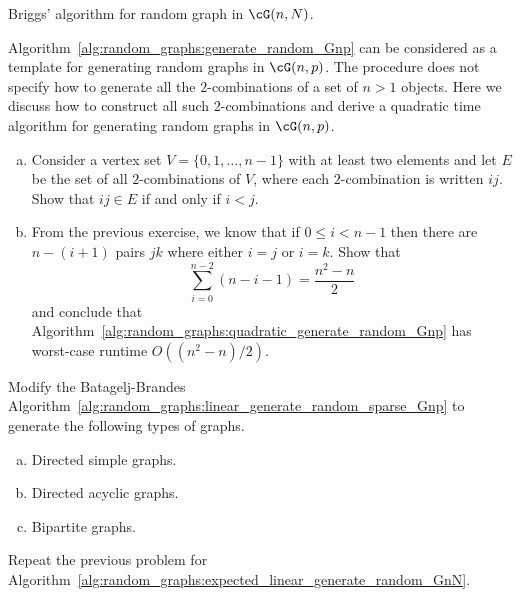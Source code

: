 \begin{problem}
\begin{algorithm}[!htbp]

\caption{Briggs' algorithm for random graph in $\cG(n,N)$.}
\label{alg:random_graphs:Briggs_random_GnN}
\end{algorithm}

\item\label{prob:random_graphs:quadratic_generate_random_Gnp}
  Algorithm~\ref{alg:random_graphs:generate_random_Gnp} can be
  considered as a template for generating random graphs in
  $\cG(n,p)$. The procedure does not specify how to generate all the
  $2$-combinations of a set of $n > 1$ objects. Here we discuss how to
  construct all such $2$-combinations and derive a quadratic time
  algorithm for generating random graphs in $\cG(n,p)$.
  \begin{enumerate}[(a)]
  \item Consider a vertex set $V = \{0, 1, \dots, n - 1\}$ with at
    least two elements and let $E$ be the set of all $2$-combinations
    of $V$, where each $2$-combination is written $ij$. Show that
    $ij \in E$ if and only if $i < j$.

  \item From the previous exercise, we know that if $0 \leq i < n - 1$
    then there are $n - (i + 1)$ pairs $jk$ where either $i = j$ or
    $i = k$. Show that
    \[
    \sum_{i=0}^{n-2} (n - i - 1)
    =
    \frac{n^2 - n}{2}
    \]
    and conclude that
    Algorithm~\ref{alg:random_graphs:quadratic_generate_random_Gnp}
    has worst-case runtime $O((n^2 - n) / 2)$.
  \end{enumerate}

\item Modify the Batagelj-Brandes
  Algorithm~\ref{alg:random_graphs:linear_generate_random_sparse_Gnp}
  to generate the following types of graphs.
  \begin{enumerate}[(a)]
  \item Directed simple graphs.

  \item Directed acyclic graphs.

  \item Bipartite graphs.
  \end{enumerate}

\item Repeat the previous problem for
  Algorithm~\ref{alg:random_graphs:expected_linear_generate_random_GnN}.


\end{problem}
